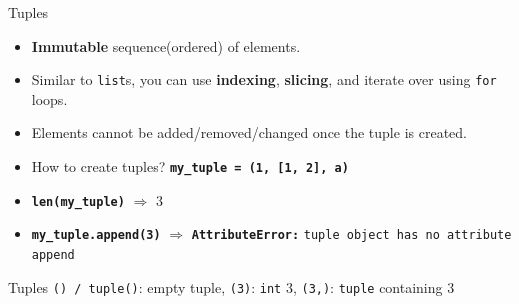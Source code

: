     \begin{frame}{Tuples}
        \LARGE
        \begin{itemize}
            \item \textbf{Immutable} sequence(ordered) of elements.
            \item Similar to \texttt{list}s, you can use \textbf{indexing}, \textbf{slicing}, and iterate over using \texttt{for} loops.
            \item Elements cannot be added/removed/changed once the tuple is created.
            \item How to create tuples?
             \textbf{\texttt{my\_tuple = (1, [1, 2], \textquotesingle a\textquotesingle )}}
            \item \textbf{\texttt{len(my\_tuple)}} $\Rightarrow$
             3
            \item \textbf{\texttt{my\_tuple.append(3)}} $\Rightarrow$
             \textbf{\texttt{AttributeError:}} \texttt{\textquotesingle tuple\textquotesingle \ object has no attribute \textquotesingle append\textquotesingle}
        \end{itemize}
    \end{frame}

    \begin{frame}{Tuples}
        \LARGE
        \texttt{() / tuple()}: empty tuple, 
         \texttt{(3)}:
         \texttt{int} 3,
         \texttt{(3,)}:
         \texttt{tuple} containing 3
        \inputminted[frame=single,framesep=2pt]{python3}{../Lecture5/code-examples/tuples.py}
    \end{frame}

